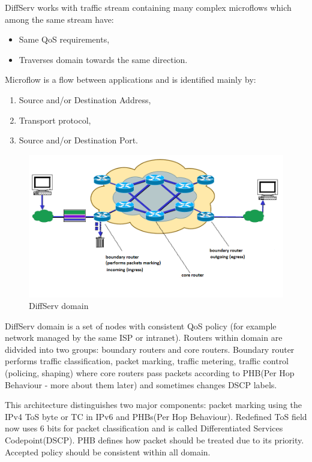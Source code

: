 \documentclass[11pt]{book}
\begin{document}
			DiffServ works with traffic stream containing many complex microflows which among the same stream have:

			\begin{itemize}
				\item Same QoS requirements,
				\item Traverses domain towards the same direction.
			\end{itemize}
			
			Microflow is a flow between applications and is identified mainly by:

			\begin{enumerate}
				\item Source and/or Destination Address,
				\item Transport protocol,
				\item Source and/or Destination Port.
			\end{enumerate}
			
			\begin{figure}[H]
				\begin{center}
					\includegraphics[width=.7\textwidth]{img/qos/diffserv.png}
				\end{center}
				\caption{DiffServ domain}
			\end{figure} %
			
      DiffServ domain is a set of nodes with consistent QoS policy (for example network managed by the same ISP or
      intranet). Routers within domain are didvided into two groups: boundary routers and core routers. Boundary router
      performs traffic classification, packet marking, traffic metering, traffic control (policing, shaping) where core
      routers pass packets according to PHB(Per Hop Behaviour - more about them later) and sometimes changes DSCP
      labels.			
			
			This architecture distinguishes two major components: packet marking using the IPv4 ToS byte or TC in
			IPv6 and PHBs(Per Hop Behaviour).
			\medskip
			Redefined ToS field now uses 6 bits for packet classification and is called Differentiated Services 
			Codepoint(DSCP). 
			PHB defines how packet should be treated due to its priority. Accepted policy should be consistent
			within all domain.
			
\end{document}
